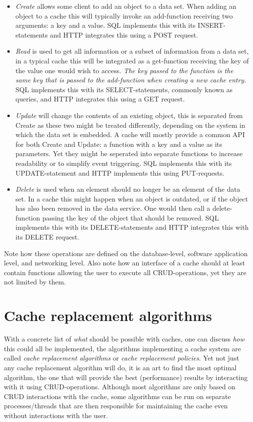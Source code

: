 \documentclass[pdftex,a4paper,12pt,twoside]{report}
\begin{document}
\begin{itemize}
\item \emph{Create} allows some client to add an object to a data set. When adding an object to a cache this will typically invoke an add-function receiving two arguments: a key and a value. SQL implements this with its INSERT-statements and HTTP integrates this using a POST request.
\item \emph{Read} is used to get all information or a subset of information from a data set, in a typical cache this will be integrated as a get-function receiving
the key of the value one would wish to access. \emph{The key passed to the function is the same key that is passed to the add-function when creating a new cache entry.} SQL implements this with its SELECT-statements, commonly known as queries, and HTTP integrates this using a GET request.
\item \emph{Update} will change the contents of an existing object, this is separated from Create as these two might be treated differently, depending on the system in which the data set is embedded. A cache will mostly provide a common API for both Create and Update: a function with a key and a value as its parameters. Yet they might be seperated into separate functions to increase readability or to simplify event triggering. SQL implements this with its UPDATE-statement and HTTP implements this using PUT-requests.
\item \emph{Delete} is used when an element should no longer be an element of the data set. In a cache this might happen when an object is outdated, or if the object has also been removed in the data service. One would then call a delete-function passing the key of the object that should be removed. SQL implements this with its DELETE-statements and HTTP integrates this with its DELETE request.
\end{itemize}
\citep{battle2008bridging} Note how these operations are defined on the database-level, software application level, and networking level. Also note how an interface of a cache should at least contain functions allowing the user to execute all CRUD-operations, yet they are not limited by them.
\chapter{Cache replacement algorithms}
With a concrete list of \emph{what} should be possible with caches, one can discuss \emph{how} this could all be implemented, the algorithms implementing a cache system are called \emph{cache replacement algorithms} or \emph{cache replacement policies}. Yet not just any cache replacement algorithm will do, it is an art to find the most optimal algorithm, the one that will provide the best (performance) results by interacting with it using CRUD-operations.
Although most algorithms are only based on CRUD interactions with the cache, some algorithms can be run on separate processes/threads that are
then responsible for maintaining the cache even without interactions with the user.
\end{document}
